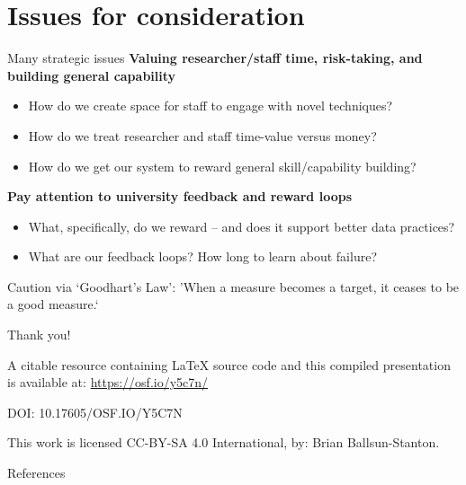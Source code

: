 \documentclass[aspectratio=169, 11pt]{beamer} %
\begin{document}
\section{Issues for consideration}
\begin{frame}{Many strategic issues}
\textbf{Valuing researcher/staff time,  risk-taking, and building general capability}
\begin{itemize}
    \item How do we create space for staff to engage with novel techniques?
    \item How do we treat researcher and staff time-value versus money?
    \item How do we get our system to reward general skill/capability building?
\end{itemize}
    
\textbf{Pay attention to university feedback and reward loops}    
    \begin{itemize}
    \item What, specifically, do we reward -- and does it support better data practices?
    \item What are our feedback loops? How long to learn about failure?
\end{itemize}


Caution via `Goodhart's Law': 'When a measure becomes a target, it ceases to be a good measure.` \parencite{Strathern1997-du, Goodhart1975-cq}

\end{frame}



\begin{frame}{Thank you!}


A citable resource containing \LaTeX{} source code and this compiled presentation is available at: \href{https://osf.io/y5c7n/}{https://osf.io/y5c7n/}

DOI: 10.17605/OSF.IO/Y5C7N

This work is licensed CC-BY-SA 4.0 International, by: Brian Ballsun-Stanton. 

\end{frame}



\begin{frame}{References}
\printbibliography[heading=none]
\end{frame}
\end{document}
